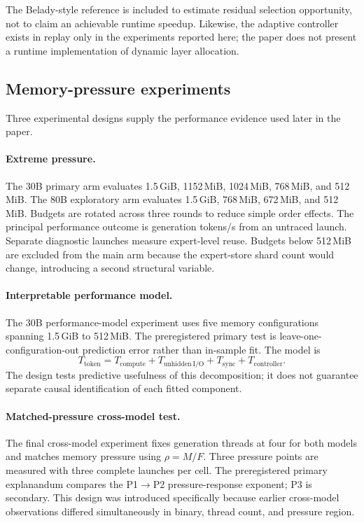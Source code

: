 The Belady-style reference is included to estimate residual selection opportunity, not to claim an achievable runtime speedup. Likewise, the adaptive controller exists in replay only in the experiments reported here; the paper does not present a runtime implementation of dynamic layer allocation.

\subsection{Memory-pressure experiments}

Three experimental designs supply the performance evidence used later in the paper.

\paragraph{Extreme pressure.}
The 30B primary arm evaluates 1.5\,GiB, 1152\,MiB, 1024\,MiB, 768\,MiB, and 512\,MiB. The 80B exploratory arm evaluates 1.5\,GiB, 768\,MiB, 672\,MiB, and 512\,MiB. Budgets are rotated across three rounds to reduce simple order effects. The principal performance outcome is generation tokens/s from an untraced launch. Separate diagnostic launches measure expert-level reuse. Budgets below 512\,MiB are excluded from the main arm because the expert-store shard count would change, introducing a second structural variable.

\paragraph{Interpretable performance model.}
The 30B performance-model experiment uses five memory configurations spanning 1.5\,GiB to 512\,MiB. The preregistered primary test is leave-one-configuration-out prediction error rather than in-sample fit. The model is
\begin{equation}
    T_{\mathrm{token}}
    =
    T_{\mathrm{compute}}
    +
    T_{\mathrm{unhidden\,I/O}}
    +
    T_{\mathrm{sync}}
    +
    T_{\mathrm{controller}} .
    \label{eq:latency-model}
\end{equation}
The design tests predictive usefulness of this decomposition; it does not guarantee separate causal identification of each fitted component.

\paragraph{Matched-pressure cross-model test.}
The final cross-model experiment fixes generation threads at four for both models and matches memory pressure using $\rho=M/F$. Three pressure points are measured with three complete launches per cell. The preregistered primary explanandum compares the P1$\rightarrow$P2 pressure-response exponent; P3 is secondary. This design was introduced specifically because earlier cross-model observations differed simultaneously in binary, thread count, and pressure region.

